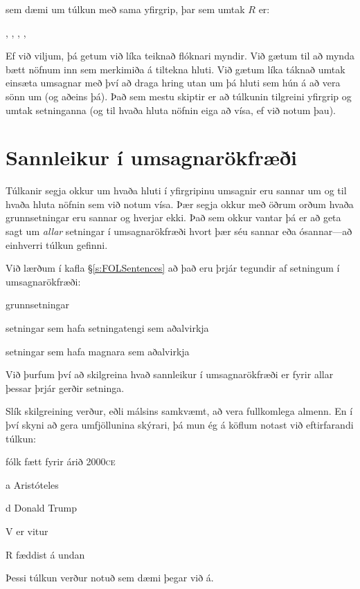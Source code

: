 \begin{center}
\end{center}
sem dæmi um túlkun með sama yfirgrip, þar sem umtak $R$ er:
	\begin{center}
		, 
		, 
		, 
		,
	\end{center}
Ef við viljum, þá getum við líka teiknað flóknari myndir. Við gætum til að mynda bætt nöfnum inn sem merkimiða á tiltekna hluti. Við gætum líka táknað umtak einsæta umsagnar með því að draga hring utan um þá hluti sem hún á að vera sönn um (og aðeins þá). Það sem mestu skiptir er að túlkunin tilgreini yfirgrip og umtak setninganna (og til hvaða hluta nöfnin eiga að vísa, ef við notum þau).

\chapter{Sannleikur í umsagnarökfræði}\label{s:TruthFOL}
Túlkanir segja okkur um hvaða hluti í yfirgripinu umsagnir eru sannar um og til hvaða hluta nöfnin sem við notum vísa. Þær segja okkur með öðrum orðum hvaða grunnsetningar eru sannar og hverjar ekki. Það sem okkur vantar þá er að geta sagt um \emph{allar} setningar í umsagnarökfræði hvort þær séu sannar eða ósannar---að einhverri túlkun gefinni.

Við lærðum í kafla \S\ref{s:FOLSentences} að það eru þrjár tegundir af setningum í umsagnarökfræði:
	\begin{ebullet}
		\item grunnsetningar
		\item setningar sem hafa setningatengi sem aðalvirkja
		\item setningar sem hafa magnara sem aðalvirkja
	\end{ebullet}
Við þurfum því að skilgreina hvað sannleikur í umsagnarökfræði er fyrir allar þessar þrjár gerðir setninga.	

Slík skilgreining verður, eðli málsins samkvæmt, að vera fullkomlega almenn. En í því skyni að gera umfjöllunina skýrari, þá mun ég á köflum notast við eftirfarandi túlkun:
	\begin{ekey}
		\item[\text{yfirgrip}] fólk fætt fyrir árið 2000\textsc{ce}
		\item[a] Aristóteles
		\item[d] Donald Trump
		\item[V]  er vitur
		\item[R]  fæddist á undan 
	\end{ekey}
Þessi túlkun verður notuð sem dæmi þegar við á.	

